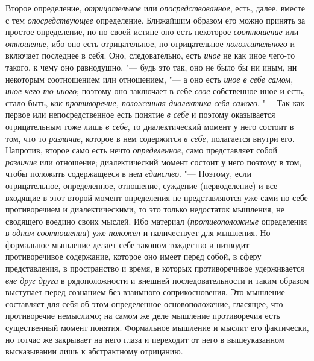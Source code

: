 Второе определение, {\em отрицательное} или
{\em опосредствованное}, есть, далее, вместе с тем {\em опосредствующее}
определение. Ближайшим образом его можно принять за простое
определение, но по своей истине оно есть некоторое
{\em соотношение} или {\em отношение}, ибо оно
есть отрицательное, но отрицательное {\em положительного} и
включает последнее в себя. Оно, следовательно, есть {\em иное} не как
иное чего-то такого, к чему оно равнодушно, "--- будь это
так, оно не было бы ни иным, ни некоторым соотношением или отношением, "---
а оно есть {\em иное в
себе самом}, {\em иное чего-то иного}; поэтому оно заключает в себе
{\em свое} собственное иное и есть, стало быть, {\em как
противоречие, положенная диалектика себя самого}. "--- Так как
первое или непосредственное есть понятие {\em в себе} и поэтому
оказывается отрицательным тоже лишь {\em в себе}, то
диалектический момент у него состоит в том, что то
{\em различие}, которое в нем содержится {\em в себе},
полагается внутри его. Напротив, второе само есть нечто
{\em определенное}, само представляет собой {\em различие}
или отношение; диалектический момент состоит у него поэтому в
том, чтобы положить содержащееся в нем {\em единство}. "---
Поэтому, если отрицательное, определенное, отношение,
суждение (перводеление) и все входящие в этот второй момент определения не
представляются уже сами по себе противоречием и диалектическими, то это
только недостаток мышления, не сводящего воедино своих мыслей. Ибо материал
({\em противоположные} определения в {\em одном соотношении}) уже
{\em положен} и наличествует для мышления. Но формальное мышление делает
себе законом тождество и низводит противоречивое содержание,
которое оно имеет перед собой, в сферу представления, в пространство и
время, в которых противоречивое удерживается {\em вне друг друга} в
рядоположности и внешней последовательности и таким образом выступает перед
сознанием без взаимного соприкосновения. Это мышление составляет для себя
об этом определенное основоположение, гласящее, что противоречие немыслимо;
на самом же деле мышление противоречия есть существенный момент понятия.
Формальное мышление и мыслит его фактически, но тотчас же закрывает на него
глаза и переходит от него в вышеуказанном высказывании лишь к абстрактному
отрицанию.

